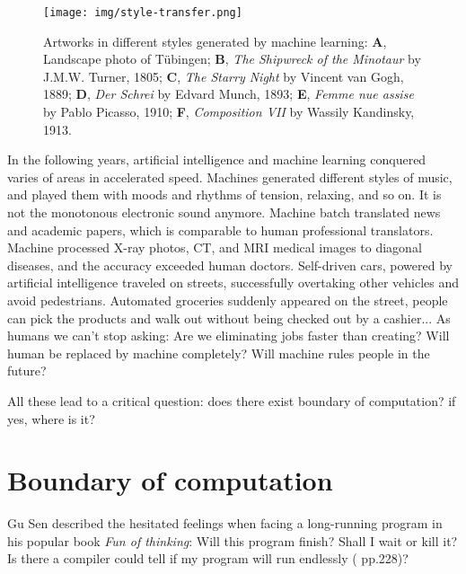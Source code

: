 \documentclass[b5paper]{article}
\begin{document}
\begin{figure}[htbp]
 \centering
 \texttt{[image: img/style-transfer.png]}
 \caption{Artworks in different styles generated by machine learning: \textbf{A}, Landscape photo of Tübingen; \textbf{B}, {\em The Shipwreck of the Minotaur} by J.M.W. Turner, 1805; \textbf{C}, {\em The Starry Night} by Vincent van Gogh, 1889; \textbf{D}, {\em Der Schrei} by Edvard Munch, 1893; \textbf{E}, {\em Femme nue assise} by Pablo Picasso, 1910; \textbf{F}, {\em Composition VII} by Wassily Kandinsky, 1913.}
 \label{fig:style-transfer}
\end{figure}

In the following years, artificial intelligence and machine learning conquered varies of areas in accelerated speed. Machines generated different styles of music, and played them with moods and rhythms of tension, relaxing, and so on. It is not the monotonous electronic sound anymore. Machine batch translated news and academic papers, which is comparable to human professional translators. Machine processed X-ray photos, CT, and MRI medical images to diagonal diseases, and the accuracy exceeded human doctors. Self-driven cars, powered by artificial intelligence traveled on streets, successfully overtaking other vehicles and avoid pedestrians. Automated groceries suddenly appeared on the street, people can pick the products and walk out without being checked out by a cashier... As humans we can't stop asking: Are we eliminating jobs faster than creating? Will human be replaced by machine completely? Will machine rules people in the future?

All these lead to a critical question: does there exist boundary of computation? if yes, where is it?

\section{Boundary of computation}

Gu Sen described the hesitated feelings when facing a long-running program in his popular book {\em Fun of thinking}: Will this program finish? Shall I wait or kill it? Is there a compiler could tell if my program will run endlessly (\cite{GuSen-2012} pp.228)?
\end{document}
